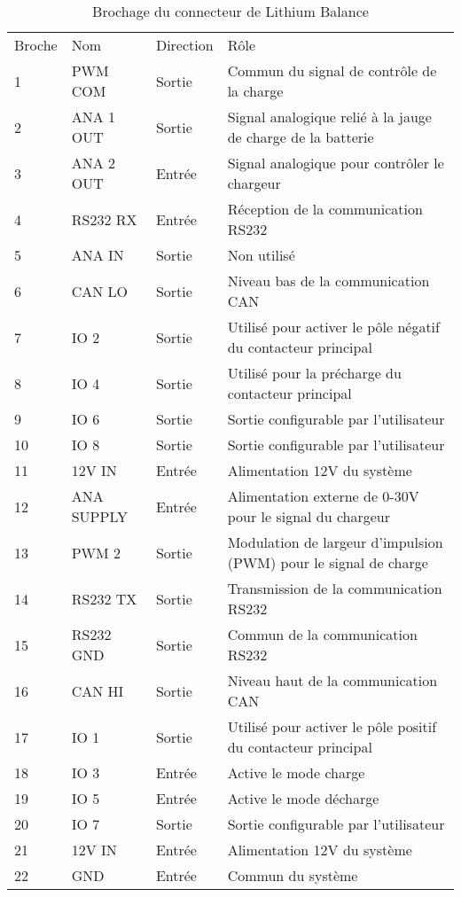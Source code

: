 	\begin{table}[H]
		\centering
		\caption{Brochage du connecteur de Lithium Balance}
		\label{22CLithiumBalance}	
		\renewcommand{\arraystretch}{1.3}
		\begin{tabular}{ | l | l | l | l | }
			\hline
			Broche & Nom & Direction & Rôle \\ \hhline{|=|=|=|=|}
			1 & PWM COM & Sortie & Commun du signal de contrôle de la charge \\ \hline
			2 & ANA 1 OUT & Sortie & Signal analogique relié à la jauge de charge de la batterie \\ \hline
			3 & ANA 2 OUT & Entrée & Signal analogique pour contrôler le chargeur \\ \hline
			4 & RS232 RX & Entrée & Réception de la communication RS232 \\ \hline
			5 & ANA IN & Sortie & Non utilisé \\ \hline
			6 & CAN LO & Sortie & Niveau bas de la communication CAN \\ \hline
			7 & IO 2 & Sortie & Utilisé pour activer le pôle négatif du contacteur principal \\ \hline
			8 & IO 4 & Sortie & Utilisé pour la précharge du contacteur principal \\ \hline
			9 & IO 6 & Sortie & Sortie configurable par l'utilisateur \\ \hline
			10 & IO 8 & Sortie & Sortie configurable par l'utilisateur \\ \hline
			11 & 12V IN & Entrée & Alimentation 12V du système \\ \hline
			12 & ANA SUPPLY & Entrée & Alimentation externe de 0-30V pour le signal du chargeur \\ \hline
			13 & PWM 2 & Sortie & Modulation de largeur d'impulsion (PWM) pour le signal de charge \\ \hline
			14 & RS232 TX & Sortie & Transmission de la communication RS232 \\ \hline
			15 & RS232 GND & Sortie & Commun de la communication RS232 \\ \hline
			16 & CAN HI & Sortie & Niveau haut de la communication CAN \\ \hline
			17 & IO 1  & Sortie & Utilisé pour activer le pôle positif du contacteur principal \\ \hline
			18 & IO 3 & Entrée & Active le mode charge \\ \hline
			19 & IO 5 & Entrée & Active le mode décharge \\ \hline
			20 & IO 7 & Sortie & Sortie configurable par l'utilisateur \\ \hline
			21 & 12V IN & Entrée & Alimentation 12V du système \\ \hline
			22 & GND & Entrée & Commun du système \\ \hline
		\end{tabular}			
	\end{table}

